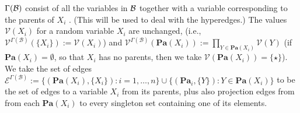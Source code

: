 \documentclass{article}
\theoremstyle{plain}
\theoremstyle{definition}
\theoremstyle{remark}
\newcommand{\V}{\mathcal V}
\newcommand{\Ed}{\mathcal E}
\newcommand\Pa{\mathbf{Pa}}
\newcommand\PDGof{\Gamma}
\numberwithin{equation}{section}
\begin{document}
\begin{defn}
		  $\PDGof(\cal B)$
consist of all the variables in
${\cal B}$ together with a variable corresponding to the parents
of $X_i$%
.  (This will be used to deal with the hyperedges.) 
                The values $\V(X_i)$ for a random variable
                $X_i$ are unchanged, 
	(i.e., $\V^{\PDGof(\mathcal B)}(\{X_i\}) := \V(X_i)$)
	and $\V^{\PDGof(\mathcal B)}(\Pa(X_i)) := \prod_{Y \in \Pa(X_i)} \V(Y)$
 (if $\Pa(X_i) = \emptyset$, so that $X_i$ has no parents, then we 
         take $\V(\Pa(X_i)) = \{\star\}$).
We take the set of edges $\Ed^{\PDGof(\mathcal B)} := \{ (\Pa(X_i), \{X_i\}) :
                i = 1, \ldots, n \} \cup \{ (\Pa_i, \{Y\}) : Y \in
                \Pa(X_i)\}$ to be the set of edges to a variable $X_i$
                from its parents, plus also projection edges from
               from each $\Pa(X_i)$ to every singleton set containing one of its elements.


\end{defn}
\end{document}
